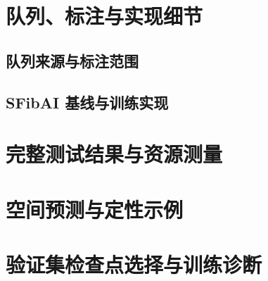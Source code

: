 \appendix
\setcounter{table}{0}
\setcounter{figure}{0}
\setcounter{equation}{0}
\renewcommand{\thetable}{S\arabic{table}}
\renewcommand{\thefigure}{S\arabic{figure}}
\renewcommand{\theequation}{S\arabic{equation}}
\renewcommand{\theHtable}{appendix.\arabic{table}}
\renewcommand{\theHfigure}{appendix.\arabic{figure}}
\renewcommand{\theHequation}{appendix.\arabic{equation}}

\section{队列、标注与实现细节}\label{sec:appendix-implementation}
\subsection{队列来源与标注范围}\label{sec:appendix-cohort}

\subsection{SFibAI 基线与训练实现}

\FloatBarrier
\section{完整测试结果与资源测量}\label{sec:appendix-results}


\FloatBarrier
\section{空间预测与定性示例}\label{sec:appendix-analyses}

\FloatBarrier
\section{验证集检查点选择与训练诊断}\label{sec:appendix-selection}

